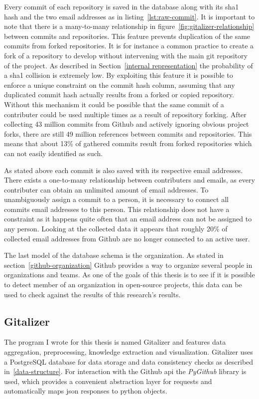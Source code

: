 Every commit of each repository is saved in the database along with its \ac{sha1} hash and the two email addresses as in listing~\ref{lst:raw-commit}.
It is important to note that there is a many-to-many relationship in figure~\ref{fig:gitalizer-relationship} between commits and repositories.
This feature prevents duplication of the same commits from forked repositories.
It is for instance a common practice to create a fork of a repository to develop without intervening with the main git repository of the project.
As described in Section~\ref{internal representation} the probability of a \ac{sha1} collision is extremely low.
By exploiting this feature it is possible to enforce a unique constraint on the commit hash column, assuming that any duplicated commit hash actually results from a forked or copied repository.
Without this mechanism it could be possible that the same commit of a contributer could be used multiple times as a result of repository forking.
After collecting 43 million commits from Github and actively ignoring obvious project forks, there are still 49 million references between commits and repositories.
This means that about 13\% of gathered commits result from forked repositories which can not easily identified as such.

As stated above each commit is also saved with its respective email addresses.
There exists a one-to-many relationship between contributers and emails, as every contributer can obtain an unlimited amount of email addresses.
To unambiguously assign a commit to a person, it is necessary to connect all commits email addresses to this person.
This relationship does not have a  constraint as it happens quite often that an email address can not be assigned to any person.
Looking at the collected data it appears that roughly 20\% of collected email addresses from Github are no longer connected to an active user.

The last model of the database schema is the organization.
As stated in section~\ref{github-organization} Github provides a way to organize several people in organizations and teams.
As one of the goals of this thesis is to see if it is possible to detect member of an organization in open-source projects, this data can be used to check against the results of this research's results.


\subsection{Gitalizer}
The program I wrote for this thesis is named Gitalizer and features data aggregation, preprocessing, knowledge extraction and visualization.
Gitalizer uses a PostgreSQL database for data storage and data consistency checks as described in~\ref{data-structure}.
For interaction with the Github \ac{api} the \emph{PyGithub} library is used, which provides a convenient abstraction layer for requests and automatically maps \ac{json} responses to python objects.


